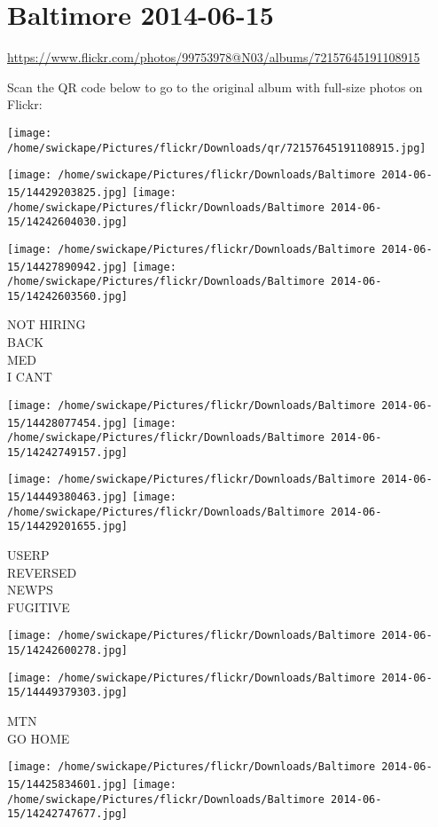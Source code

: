 \documentclass[10pt,letterpaper]{article}
\title{}
\author{}
\date{}
\begin{document}
\section*{Baltimore 2014-06-15}

\url{https://www.flickr.com/photos/99753978@N03/albums/72157645191108915}

Scan the QR code below to go to the original album with full-size photos on Flickr:

\texttt{[image: /home/swickape/Pictures/flickr/Downloads/qr/72157645191108915.jpg]}
\pagebreak

\texttt{[image: /home/swickape/Pictures/flickr/Downloads/Baltimore 2014-06-15/14429203825.jpg]}
\texttt{[image: /home/swickape/Pictures/flickr/Downloads/Baltimore 2014-06-15/14242604030.jpg]}

\texttt{[image: /home/swickape/Pictures/flickr/Downloads/Baltimore 2014-06-15/14427890942.jpg]}
\texttt{[image: /home/swickape/Pictures/flickr/Downloads/Baltimore 2014-06-15/14242603560.jpg]}

NOT HIRING\\
BACK\\
MED\\
I CANT
\pagebreak

\texttt{[image: /home/swickape/Pictures/flickr/Downloads/Baltimore 2014-06-15/14428077454.jpg]}
\texttt{[image: /home/swickape/Pictures/flickr/Downloads/Baltimore 2014-06-15/14242749157.jpg]}

\texttt{[image: /home/swickape/Pictures/flickr/Downloads/Baltimore 2014-06-15/14449380463.jpg]}
\texttt{[image: /home/swickape/Pictures/flickr/Downloads/Baltimore 2014-06-15/14429201655.jpg]}

USERP\\
REVERSED\\
NEWPS\\
FUGITIVE
\pagebreak

\texttt{[image: /home/swickape/Pictures/flickr/Downloads/Baltimore 2014-06-15/14242600278.jpg]}

\vspace{0.25in}
\texttt{[image: /home/swickape/Pictures/flickr/Downloads/Baltimore 2014-06-15/14449379303.jpg]}

MTN\\
GO HOME
\pagebreak

\texttt{[image: /home/swickape/Pictures/flickr/Downloads/Baltimore 2014-06-15/14425834601.jpg]}
\texttt{[image: /home/swickape/Pictures/flickr/Downloads/Baltimore 2014-06-15/14242747677.jpg]}
\end{document}
